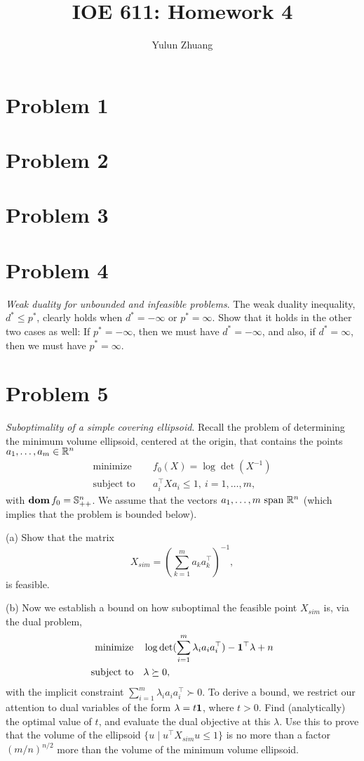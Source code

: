 \documentclass[11pt]{article}
\newcommand{\T}{^\top}
\begin{document}
\title{IOE 611: Homework 4}
\author{Yulun Zhuang}
\maketitle
\section*{Problem 1}

\clearpage
\section*{Problem 2}

\clearpage
\section*{Problem 3}

\clearpage
\section*{Problem 4}
\textit{Weak duality for unbounded and infeasible problems}. 
The weak duality inequality, $d^* \leq p^*$,
clearly holds when $d^* = -\infty$ or $p^* = \infty$. Show that it holds in the other two cases as well: If $p^* = -\infty$, then we must have $d^* = -\infty$, and also, if $d^* = \infty$, then we must have $p^* = \infty$.

\clearpage
\section*{Problem 5}
\textit{Suboptimality of a simple covering ellipsoid}. 
Recall the problem of determining the minimum
volume ellipsoid, centered at the origin, that contains the points $a_1, \dots, a_m\in{{\mathbb{R}}}^n$
\begin{align*}
  \text{minimize}\quad& f_0(X) = \log\det(X^{-1})\\
  \text{subject to}\quad & a_i\T X a_i \leq 1, \ i=1,\dots, m,
\end{align*}
with $\mathop{\textbf{dom}} f_0 = {{\mathbb{S}}}^n_{++}$.
We assume that the vectors $a_1, \dots, m \text{ span } {{\mathbb{R}}}^n$ (which implies that the problem is bounded below).

(a) Show that the matrix
\[
X_{sim} = \left(\sum_{k=1}^{m}a_ka_k\T\right)^{-1},
\]
is feasible.

(b) Now we establish a bound on how suboptimal the feasible point $X_{sim}$ is, via the dual
problem,
\begin{align*}
  \text{minimize}\quad& \log\det(\sum_{i=1}^{m} \lambda_i a_i a_i\T) - \ones\T \lambda + n\\
  \text{subject to}\quad & \lambda \succeq 0,
\end{align*}
with the implicit constraint $\sum_{i=1}^{m} \lambda_i a_i a_i\T \succ 0$.
To derive a bound, we restrict our attention to dual variables of the form $\lambda = t\mathbf 1$, where $t > 0$. Find (analytically) the optimal value of $t$, and evaluate the dual objective at this $\lambda$. Use this to prove that the volume of the ellipsoid $\{u\mid u\T X_{sim}u\leq 1\}$ is no more than a factor $(m/n)^{n/2}$ more than the volume of the minimum volume ellipsoid.
\end{document}
